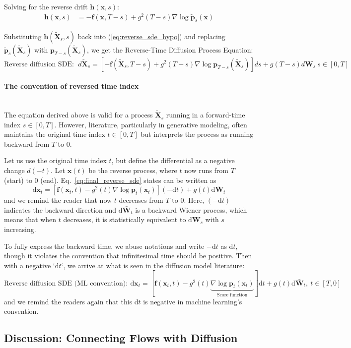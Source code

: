 \documentclass{article}
\begin{document}
\indent
Solving for the reverse drift $\mathbf{h}(\mathbf{x}, s)$:
%
\begin{align*}
    \mathbf{h}(\mathbf{x}, s) &= -\mathbf{f}(\mathbf{x}, T-s) + g^2(T-s) \nabla \log \tilde{\mathbf{p}}_s(\mathbf{x})
\end{align*}

Substituting $\mathbf{h}(\tilde{\mathbf{X}}_s, s)$ back into (\ref{eq:reverse_sde_hypo}) and replacing $\tilde{\mathbf{p}}_s(\tilde{\mathbf{X}}_s)$ with $\mathbf{p}_{T-s}(\tilde{\mathbf{X}}_s)$, we get the Reverse-Time Diffusion Process Equation:
\begin{equation}
\text{Reverse diffusion SDE}: \ \ 
    d\tilde{\mathbf{X}}_s = \left[-\mathbf{f}(\tilde{\mathbf{X}}_s, T-s) + g^2(T-s) \nabla \log \mathbf{p}_{T-s}(\tilde{\mathbf{X}}_s)\right] ds + g(T-s) d\mathbf{W}_s\ s\in [0,T]
    \label{eq:final_reverse_sde}
\end{equation}

\paragraph{The convention of reversed time index}
\ \\ \indent  The equation derived above is valid for a process $\tilde{\mathbf{X}}_s$ running in a forward-time index $s \in [0, T]$. However, literature, particularly in generative modeling, often maintains the original time index $t \in [0, T]$ but interprets the process as running backward from $T$ to $0$.

Let us use the original time index $t$, but define the differential as a negative change $d(-t)$. Let $\mathbf{x}(t)$ be the reverse process, where $t$ now runs from $T$ (start) to $0$ (end). Eq.~\eqref{eq:final_reverse_sde} states can be written as 
$$
\mathrm{d}\mathbf{x}_t = \left[\mathbf{f}(\mathbf{x}_t, t) - g^2(t) \nabla \log \mathbf{p}_t(\mathbf{x}_t)\right] (-\mathrm{d}t) + g(t) \mathrm{d}\mathbf{\bar{W}}_t
$$
and we remind the reader that now $t$ decreases from $T$ to 0. 
Here, $(-\mathrm{d}t)$ indicates the backward direction and $\mathrm{d}\mathbf{\bar{W}}_t$ is a backward Wiener process, which means that when $t$ decreases, it is statistically equivalent to $\mathrm{d}\mathbf{W}_s$ with $s$ increasing. 

To fully express the backward time, we abuse notations and write $-\mathrm{d}t$ as $\mathrm{d}t$, though it violates the convention that infinitesimal time should be positive. Then with a negative `$\mathrm{d}t$`, we arrive at what is seen in the diffusion model literature:
$$
\text{Reverse diffusion SDE (ML convention)}: \  
\mathrm{d}\mathbf{x}_t = \left[\mathbf{f}(\mathbf{x}_t, t) - g^2(t) 
\underbrace{\nabla \log \mathbf{p}_t(\mathbf{x}_t)}_{\text{Score function}}
\right] \mathrm{d}t
+ g(t) \mathrm{d}\mathbf{\bar{W}}_t, \ t\in [T,0]
$$
and we remind the readers again that this $\mathrm{d}t$ is negative in machine learning's convention. 


\subsection{Discussion: Connecting Flows with Diffusion}



 
\newpage


% 
% 

\newpage
\onecolumn
\end{document}
